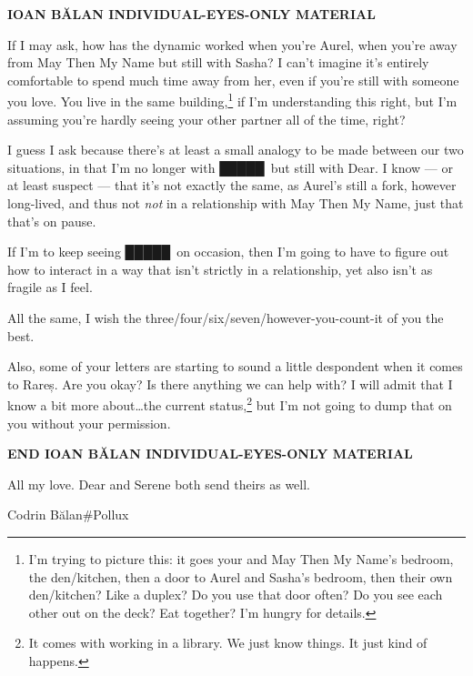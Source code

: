 \begin{center}
\textbf{IOAN BĂLAN INDIVIDUAL-EYES-ONLY MATERIAL}
\end{center}

If I may ask, how has the dynamic worked when you're Aurel, when you're away from May Then My Name but still with Sasha? I can't imagine it's entirely comfortable to spend much time away from her, even if you're still with someone you love. You live in the same building,\footnote{I'm trying to picture this: it goes your and May Then My Name's bedroom, the den/kitchen, then a door to Aurel and Sasha's bedroom, then their own den/kitchen? Like a duplex? Do you use that door often? Do you see each other out on the deck? Eat together? I'm hungry for details.} if I'm understanding this right, but I'm assuming you're hardly seeing your other partner all of the time, right?

I guess I ask because there's at least a small analogy to be made between our two situations, in that I'm no longer with █████\ but still with Dear. I know — or at least suspect — that it's not exactly the same, as Aurel's still a fork, however long-lived, and thus not \emph{not} in a relationship with May Then My Name, just that that's on pause.

If I'm to keep seeing █████\ on occasion, then I'm going to have to figure out how to interact in a way that isn't strictly in a relationship, yet also isn't as fragile as I feel.

All the same, I wish the three/four/six/seven/however-you-count-it of you the best.

Also, some of your letters are starting to sound a little despondent when it comes to Rareș. Are you okay? Is there anything we can help with? I will admit that I know a bit more about\ldots the current status,\footnote{It comes with working in a library. We just know things. It just kind of happens.} but I'm not going to dump that on you without your permission.

\begin{center}
\textbf{END IOAN BĂLAN INDIVIDUAL-EYES-ONLY MATERIAL}
\end{center}

All my love. Dear and Serene both send theirs as well.

Codrin Bălan\#Pollux
